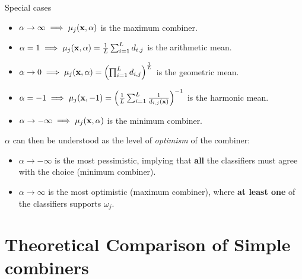 \documentclass[xcolor=table]{beamer}
\begin{document}
\begin{frame}{Special cases}
\begin{itemize}
\item \(\alpha \to \infty \implies \mu_j({\mathbf x},\alpha)\) is the maximum combiner.\\
    \pause
    \pause
    
    \item \(\alpha = 1 \implies \mu_j({\mathbf x},\alpha) = \frac{1}{L} \sum_{i=1}^L d_{i,j}\) is the arithmetic mean.
    \item \(\alpha \to 0 \implies \mu_j({\mathbf x},\alpha) = \left(\prod_{i=1}^L d_{i,j}\right)^{\frac{1}{L}}\) is the geometric mean.
    \item \(\alpha = -1 \implies \mu_j({\mathbf x},-1) = \left( \frac{1}{L} \sum_{i=1}^L \frac{1}{d_{i,j}({\mathbf x})} \right)^{-1} \) is the harmonic mean.
    
    
    \item \(\alpha \to -\infty \implies \mu_j({\mathbf x},\alpha)\) is the minimum combiner.\\
\end{itemize}

\pause

\(\alpha\) can then be understood as the level of \emph{optimism} of the combiner:
\begin{itemize}
    \item \(\alpha \to -\infty\) is the most pessimistic, implying that \textbf{all} the classifiers must agree with the choice (minimum combiner).
    \item \(\alpha \to \infty\) is the most optimistic (maximum combiner), where \textbf{at least one} of the classifiers supports \(\omega_j\).
\end{itemize} 
    
\end{frame}

\section{Theoretical Comparison of Simple combiners}
\end{document}
